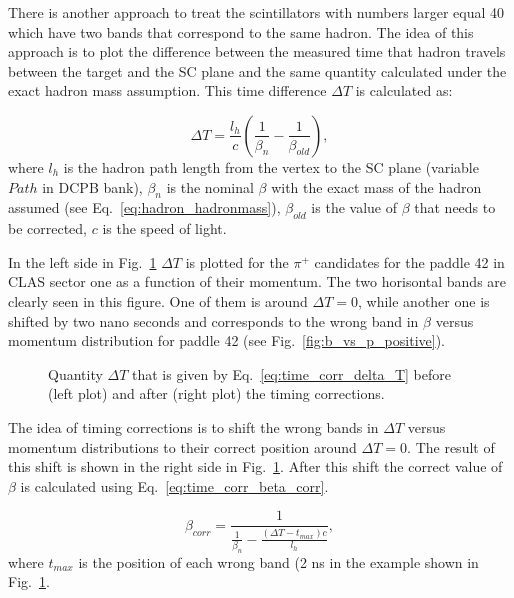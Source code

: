 There is another approach to treat the scintillators with numbers larger equal 40 which have two bands that  correspond to the same hadron. 
The idea of this approach is to plot the difference between the measured time that hadron travels between the target and the SC plane and the same quantity calculated under the exact hadron mass assumption.
This time difference $\Delta T$ is calculated as:

\begin{equation}
\Delta T=\frac{l_{h}}{c}\left ( \frac{1}{\beta_{n} } -\frac{1}{\beta _{old}}\right ),
\label{eq:time_corr_delta_T}
\end{equation}
where $l_{h}$ is the hadron path length from the vertex to the SC plane (variable $Path$ in DCPB bank), $\beta_{n}$ is the nominal $\beta$ with the exact mass of the hadron assumed (see Eq.~\ref{eq:hadron_hadronmass}), $\beta_{old}$ is the value of $\beta$ that needs to be corrected, $c$ is the speed of light.

In the left side in Fig.~\ref{fig:time_corr} $\Delta T$ is plotted for the $\pi^{+}$ candidates for the paddle 42 in CLAS sector one as a function of their momentum. The two horisontal bands are clearly seen in this figure. One of them is around $\Delta T = 0$, while another one is shifted by two nano seconds and corresponds to the wrong band in $\beta$ versus momentum distribution for paddle 42 (see Fig.~\ref{fig:b_vs_p_positive}).




\begin{figure}[htp]
\begin{center}
\caption{\small  Quantity $\Delta T$ that is given by Eq.~\ref{eq:time_corr_delta_T} before (left plot) and after (right plot) the timing corrections. \label{fig:time_corr}} 
\end{center}
\end{figure}

The idea of timing corrections is to shift the wrong bands in $\Delta T$ versus momentum distributions to their correct position around $\Delta T = 0$. The result of this shift is shown in the right side in Fig.~\ref{fig:time_corr}. After this shift the correct value of  $\beta$ is calculated using Eq.~\ref{eq:time_corr_beta_corr}.

\begin{equation}
\beta _{corr} = \frac{1}{\frac{1}{\beta _{n}}-\frac{(\Delta T-t_{max})c}{l_{h}}},
\label{eq:time_corr_beta_corr}
\end{equation}
where $t_{max}$ is the position of each wrong band (2 ns in the example shown in Fig.~\ref{fig:time_corr}.

